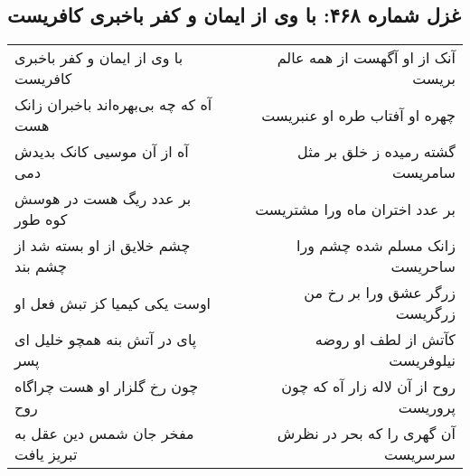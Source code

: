 \begin{center}
\section*{غزل شماره ۴۶۸: با وی از ایمان و کفر باخبری کافریست}
\label{sec:0468}
\begin{longtable}{l p{0.5cm} r}
با وی از ایمان و کفر باخبری کافریست
&&
آنک از او آگهست از همه عالم بریست
\\
آه که چه بی‌بهره‌اند باخبران زانک هست
&&
چهره او آفتاب طره او عنبریست
\\
آه از آن موسیی کانک بدیدش دمی
&&
گشته رمیده ز خلق بر مثل سامریست
\\
بر عدد ریگ هست در هوسش کوه طور
&&
بر عدد اختران ماه ورا مشتریست
\\
چشم خلایق از او بسته شد از چشم بند
&&
زانک مسلم شده چشم ورا ساحریست
\\
اوست یکی کیمیا کز تبش فعل او
&&
زرگر عشق ورا بر رخ من زرگریست
\\
پای در آتش بنه همچو خلیل ای پسر
&&
کآتش از لطف او روضه نیلوفریست
\\
چون رخ گلزار او هست چراگاه روح
&&
روح از آن لاله زار آه که چون پروریست
\\
مفخر جان شمس دین عقل به تبریز یافت
&&
آن گهری را که بحر در نظرش سرسریست
\\
\end{longtable}
\end{center}
